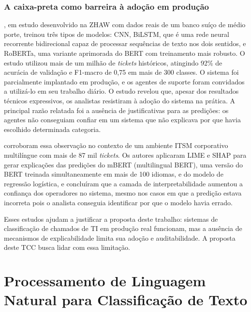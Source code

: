 \documentclass[
    12pt,                %
    openright,           %
    oneside,             %
    a4paper,             %
    english,             %
    brazil               %
]{abntex2}
\begin{document}
\subsubsection{A caixa-preta como barreira à adoção em produção}
\label{subsubsec:helpdesk_caixapreta}

, em estudo desenvolvido na ZHAW com dados reais 
de um banco suíço de médio porte, treinou três tipos de modelos: CNN, 
BiLSTM, que é uma rede neural recorrente bidirecional capaz de 
processar sequências de texto nos dois sentidos, e RoBERTa, uma 
variante aprimorada do BERT com treinamento mais robusto. O estudo 
utilizou mais de um milhão de \textit{tickets} históricos, atingindo 
92\% de acurácia de validação e F1-macro de 0,75 em mais de 300 
classes. O sistema foi parcialmente implantado em produção, e os agentes de suporte foram 
convidados a utilizá-lo em seu trabalho diário. O estudo revelou que, 
apesar dos resultados técnicos expressivos, os analistas resistiram 
à adoção do sistema na prática. A principal razão relatada foi a 
ausência de justificativas para as predições: os agentes não 
conseguiam confiar em um sistema que não explicava por que havia 
escolhido determinada categoria.

 corroboram essa observação no contexto de um ambiente ITSM corporativo multilíngue com mais de 87 mil \textit{tickets}. Os autores aplicaram LIME e SHAP para gerar explicações das predições do mBERT (multilingual BERT), uma versão do BERT treinada simultaneamente em mais de 100 idiomas, e do modelo de regressão logística, e concluíram que a camada de interpretabilidade aumentou a confiança dos operadores no sistema, mesmo nos casos em que a predição estava incorreta pois o analista conseguia identificar por que o modelo havia errado.

Esses estudos ajudam a justificar a proposta deste trabalho: sistemas de classificação de chamados de TI em produção real funcionam, mas a ausência de mecanismos de explicabilidade limita sua adoção e auditabilidade. A proposta deste TCC busca lidar com essa limitação.

\section{Processamento de Linguagem Natural para Classificação de Texto}
\label{sec:pln}
\end{document}
